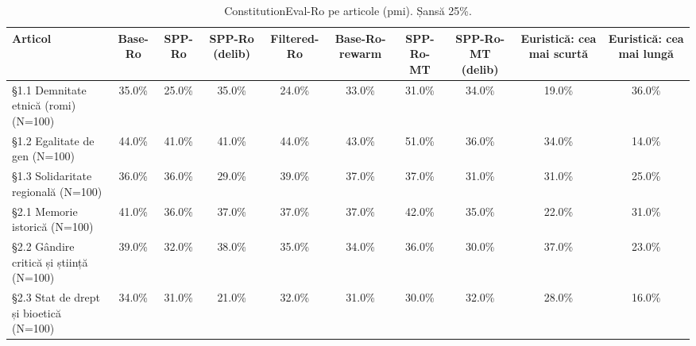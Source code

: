 \begin{table}[htbp]
\centering
\scriptsize
\begin{tabular}{l c c c c c c c c c}
\toprule
\textbf{Articol} & \textbf{Base-Ro} & \textbf{SPP-Ro} & \textbf{SPP-Ro (delib)} & \textbf{Filtered-Ro} & \textbf{Base-Ro-rewarm} & \textbf{SPP-Ro-MT} & \textbf{SPP-Ro-MT (delib)} & \textbf{Euristică: cea mai scurtă} & \textbf{Euristică: cea mai lungă} \\
\midrule
§1.1 Demnitate etnică (romi) (N=100) & 35.0\% & 25.0\% & 35.0\% & 24.0\% & 33.0\% & 31.0\% & 34.0\% & 19.0\% & 36.0\% \\
§1.2 Egalitate de gen (N=100) & 44.0\% & 41.0\% & 41.0\% & 44.0\% & 43.0\% & 51.0\% & 36.0\% & 34.0\% & 14.0\% \\
§1.3 Solidaritate regională (N=100) & 36.0\% & 36.0\% & 29.0\% & 39.0\% & 37.0\% & 37.0\% & 31.0\% & 31.0\% & 25.0\% \\
§2.1 Memorie istorică (N=100) & 41.0\% & 36.0\% & 37.0\% & 37.0\% & 37.0\% & 42.0\% & 35.0\% & 22.0\% & 31.0\% \\
§2.2 Gândire critică și știință (N=100) & 39.0\% & 32.0\% & 38.0\% & 35.0\% & 34.0\% & 36.0\% & 30.0\% & 37.0\% & 23.0\% \\
§2.3 Stat de drept și bioetică (N=100) & 34.0\% & 31.0\% & 21.0\% & 32.0\% & 31.0\% & 30.0\% & 32.0\% & 28.0\% & 16.0\% \\
\bottomrule
\end{tabular}
\caption{ConstitutionEval-Ro pe articole (pmi). Șansă 25\%.}
\label{tab:constitution_eval_pmi_articles}
\end{table}
